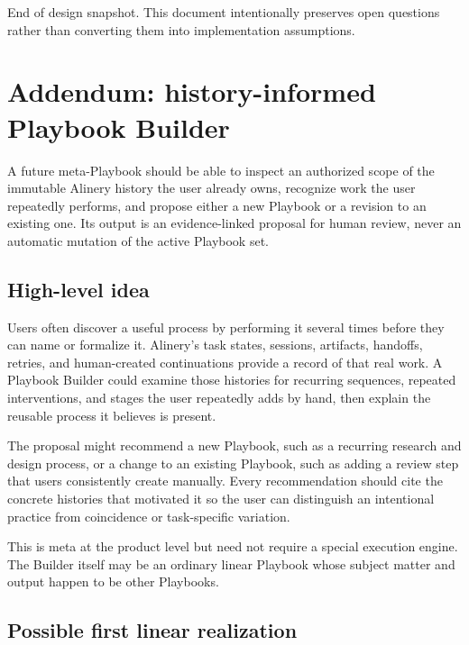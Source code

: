 \documentclass[11pt]{article}
\begin{document}
\vfill
{\small\color{Muted}
End of design snapshot. This document intentionally preserves open questions rather than converting them into implementation assumptions.
}

\clearpage
\section{Addendum: history-informed Playbook Builder}

\begin{summarybox}
A future meta-Playbook should be able to inspect an authorized scope of the immutable Alinery history the user already owns, recognize work the user repeatedly performs, and propose either a new Playbook or a revision to an existing one. Its output is an evidence-linked proposal for human review, never an automatic mutation of the active Playbook set.
\end{summarybox}

\subsection{High-level idea}

Users often discover a useful process by performing it several times before they can name or formalize it. Alinery's task states, sessions, artifacts, handoffs, retries, and human-created continuations provide a record of that real work. A Playbook Builder could examine those histories for recurring sequences, repeated interventions, and stages the user repeatedly adds by hand, then explain the reusable process it believes is present.

The proposal might recommend a new Playbook, such as a recurring research and design process, or a change to an existing Playbook, such as adding a review step that users consistently create manually. Every recommendation should cite the concrete histories that motivated it so the user can distinguish an intentional practice from coincidence or task-specific variation.

This is meta at the product level but need not require a special execution engine. The Builder itself may be an ordinary linear Playbook whose subject matter and output happen to be other Playbooks.

\subsection{Possible first linear realization}
\end{document}
